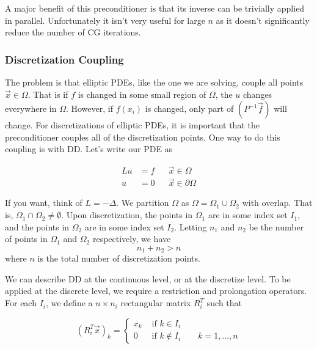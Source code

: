 A major benefit of this preconditioner is that its inverse can be trivially applied in parallel. Unfortunately it isn't very useful for large $n$ as it doesn't significantly reduce the number of CG iterations.

\subsubsection{Discretization Coupling}
The problem is that elliptic PDEs, like the one we are solving, couple all points $\vec{x}\in\Omega$. That is if $f$ is changed in some small region of $\Omega$, the $u$ changes everywhere in $\Omega$. However, if $f(x_i)$ is changed, only part of $\left(P^{-1}\vec{f}\right)$ will change. For discretizations of elliptic PDEs, it is important that the preconditioner couples all of the discretization points. One way to do this coupling is with DD. Let's write our PDE as

\begin{align*}
    Lu &=f &&\vec{x} \in \Omega \\
    u &= 0 &&\vec{x}\in \partial \Omega
\end{align*}

If you want, think of $L=-\Delta$. We partition $\Omega$ as $\Omega=\Omega_1 \cup \Omega_2$ with overlap. That is, $\Omega_1 \cap \Omega_2 \neq \emptyset$. Upon discretization, the points in $\Omega_1$ are in some index set $I_1$, and the points in $\Omega_2$ are in some index set $I_2$. Letting $n_1$ and $n_2$ be the number of points in $\Omega_1$ and $\Omega_2$ respectively, we have
\begin{equation*}
    n_1 + n_2 > n
\end{equation*}
where $n$ is the total number of discretization points.



We can describe DD at the continuous level, or at the discretize level. To be applied at the discrete level, we require a restriction and prolongation operators. For each $I_i$, we define a $n \times n_i$ rectangular matrix $R_i^T$ such that

\begin{equation*}
    (R_i^T \vec{x})_k = \begin{cases}
        x_k & \text{ if } k\in I_i\\
        0 & \text{ if } k \notin I_i \qquad k=1, \ldots, n
\end{cases}
\end{equation*}

